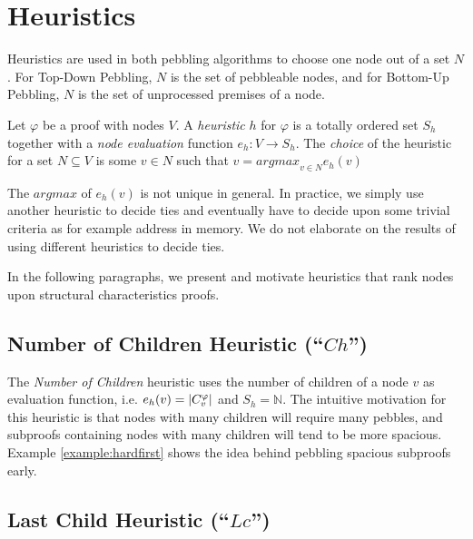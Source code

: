 \section{Heuristics}
\label{sec:heuristics}

Heuristics are used in both pebbling algorithms to choose one node out of a set $N$. 
For Top-Down Pebbling, $N$ is the set of pebbleable nodes, and for Bottom-Up Pebbling, $N$ is the set of unprocessed premises of a node. 

\begin{definition}[Heuristic]

Let $\varphi$ be a proof with nodes $V$.
A \emph{heuristic} $h$ for $\varphi$ is a totally ordered set $S_h$ together with a \emph{node evaluation} function $e_h: V \rightarrow S_h$.
The \emph{choice} of the heuristic for a set $N \subseteq V$ is some $v \in N$ such that $v = \mathit{argmax}_{v \in N} e_h(v)$
\end{definition}

The $\mathit{argmax}$ of $e_h(v)$ is not unique in general.
In practice, we simply use another heuristic to decide ties and eventually have to decide upon some trivial criteria as for example address in memory.
We do not elaborate on the results of using different heuristics to decide ties.

In the following paragraphs, we present and motivate heuristics that rank nodes upon structural characteristics proofs.

\subsection{Number of Children Heuristic (``$Ch$'')}
\label{sec:children}
The \emph{Number of Children} heuristic uses the number of children of a node $v$ as evaluation function, i.e. $e_h(v) = |C_{v}^{\varphi}|$ and $S_h = \mathbb{N}$.
The intuitive motivation for this heuristic is that nodes with many children will require many pebbles, and subproofs containing nodes with many children will tend to be more spacious.
Example \ref{example:hardfirst} shows the idea behind pebbling spacious subproofs early.

\subsection{Last Child Heuristic (``$Lc$'')}
\label{sec:lastchild}

